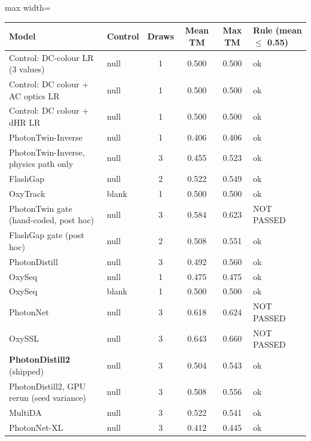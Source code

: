 {\footnotesize
\setlength{\tabcolsep}{4pt}
\begin{adjustbox}{max width=\linewidth}
\begin{tabular}{p{4.4cm}lcccl}
\toprule
Model & Control & Draws & Mean TM & Max TM & Rule (mean $\le$ 0.55) \\
\midrule
Control: DC-colour LR (3 values) & null & 1 & 0.500 & 0.500 & ok \\
Control: DC colour + AC optics LR & null & 1 & 0.500 & 0.500 & ok \\
Control: DC colour + dHR LR & null & 1 & 0.500 & 0.500 & ok \\
PhotonTwin-Inverse & null & 1 & 0.406 & 0.406 & ok \\
PhotonTwin-Inverse, physics path only & null & 3 & 0.455 & 0.523 & ok \\
FlashGap & null & 2 & 0.522 & 0.549 & ok \\
OxyTrack & blank & 1 & 0.500 & 0.500 & ok \\
PhotonTwin gate (hand-coded, post hoc) & null & 3 & 0.584 & 0.623 & NOT PASSED \\
FlashGap gate (post hoc) & null & 2 & 0.508 & 0.551 & ok \\
PhotonDistill & null & 3 & 0.492 & 0.560 & ok \\
OxySeq & null & 1 & 0.475 & 0.475 & ok \\
OxySeq & blank & 1 & 0.500 & 0.500 & ok \\
PhotonNet & null & 3 & 0.618 & 0.624 & NOT PASSED \\
OxySSL & null & 3 & 0.643 & 0.660 & NOT PASSED \\
\textbf{PhotonDistill2} (shipped) & null & 3 & 0.504 & 0.543 & ok \\
PhotonDistill2, GPU rerun (seed variance) & null & 3 & 0.508 & 0.556 & ok \\
MultiDA & null & 3 & 0.522 & 0.541 & ok \\
PhotonNet-XL & null & 3 & 0.412 & 0.445 & ok \\
\bottomrule
\end{tabular}
\end{adjustbox}
}
